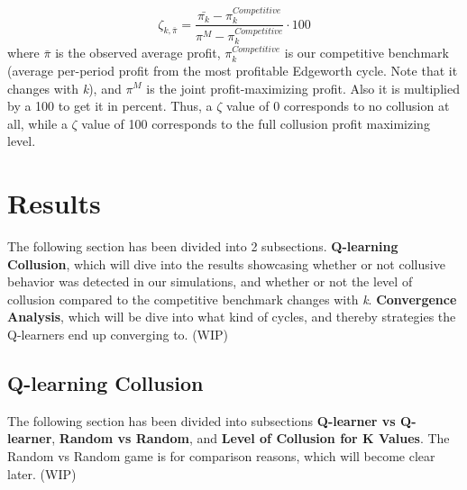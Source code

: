 \documentclass{article}
\begin{document}
\begin{equation}
\label{zeta}
    \zeta_{k,\bar{\pi}} = \frac{\bar{\pi_k} - \pi^{Competitive}_k}{\pi^M - \pi^{Competitive}_k} \cdot 100 
\end{equation}
where \(\bar{\pi}\) is the observed average profit, \(\pi^{Competitive}_k\) is our competitive benchmark (average per-period profit from the most profitable Edgeworth cycle. Note that it changes with \textit{k}), and \(\pi^M\) is the joint profit-maximizing profit. Also it is multiplied by a 100 to get it in percent. 
Thus, a $\zeta$ value of 0 corresponds to no collusion at all, while a $\zeta$ value of 100 corresponds to the full collusion profit maximizing level.


\section{Results}
\label{Results section}
The following section has been divided into 2 subsections. \textbf{Q-learning Collusion}, which will dive into the results showcasing whether or not collusive behavior was detected in our simulations, and whether or not the level of collusion compared to the competitive benchmark changes with \textit{k}. \textbf{Convergence Analysis}, which will be dive into what kind of cycles, and thereby strategies the Q-learners end up converging to. (WIP)
\subsection{Q-learning Collusion}
\label{Q-learning Collusion}
The following section has been divided into subsections \textbf{Q-learner vs Q-learner}, \textbf{Random vs Random}, and \textbf{Level of Collusion for K Values}. The Random vs Random game is for comparison reasons, which will become clear later. (WIP)
\end{document}
